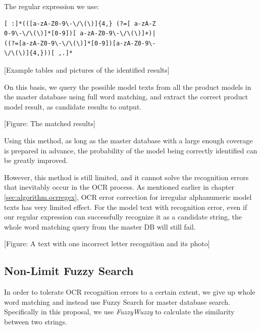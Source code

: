 \documentclass[technicalreport]{ieicej}
\begin{document}
        The regular expression we use:

        \begin{center}
        \begin{BVerbatim}
[ :]*(([a-zA-Z0-9\-\/\(\)]{4,} (?=[ a-zA-Z
0-9\-\/\(\)]*[0-9])[ a-zA-Z0-9\-\/\(\)]+)|
((?=[a-zA-Z0-9\-\/\(\)]*[0-9])[a-zA-Z0-9\-
\/\(\)]{4,}))[ ,.]*
        \end{BVerbatim}
        \end{center}

        [Example tables and pictures of the identified results]

        \vspace*{\baselineskip}

        On this basis, we query the possible model texts from all the product models in the master database using full word matching, and extract the correct product model result, as candidate results to output.
    
        \vspace*{\baselineskip}
        [Figure: The matched results]
        \vspace*{\baselineskip}
    
        Using this method, as long as the master database with a large enough coverage is prepared in advance, the probability of the model being correctly identified can be greatly improved.
        
        However, this method is still limited, and it cannot solve the recognition errors that inevitably occur in the OCR process. As mentioned earlier in chapter \ref{sec:algorithm.ocrregex}, OCR error correction for irregular alphanumeric model texts has very limited effect. For the model text with recognition error, even if our regular expression can successfully recognize it as a candidate string, the whole word matching query from the master DB will still fail.
    
        \vspace*{\baselineskip}
        [Figure: A text with one incorrect letter recognition and its photo]
        \vspace*{\baselineskip}
    
    \subsection {Non-Limit Fuzzy Search}
        In order to tolerate OCR recognition errors to a certain extent, we give up whole word matching and instead use Fuzzy Search for master database search. Specifically in this proposal, we use {\em FuzzyWuzzy} to calculate the similarity between two strings.
        
\end{document}
